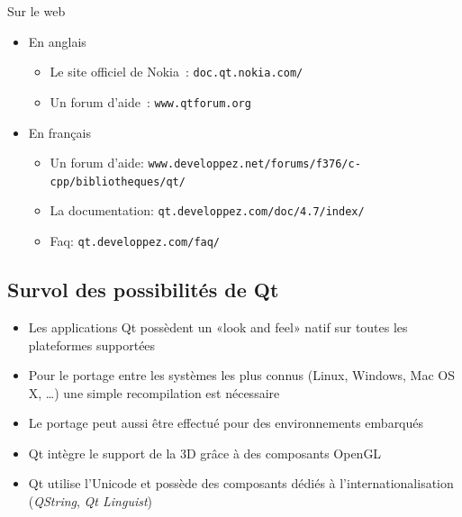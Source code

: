 \documentclass{beamer} %
\begin{document}
\begin{frame}{Sur le web}
	\begin{itemize}
	\item<1-> En anglais
		\begin{itemize}
			\item Le site officiel de Nokia~: \texttt{\small doc.qt.nokia.com/}
			\item Un forum d'aide~: \texttt{\small www.qtforum.org}
		\end{itemize}
	\vspace{10 mm}
	\item<2-> En français
		\begin{itemize}
			\item<2-> Un forum d'aide: \texttt{\small www.developpez.net/forums/f376/c-cpp/bibliotheques/qt/}
			\item<2-> La documentation: \texttt{\small qt.developpez.com/doc/4.7/index/}
			\item<2-> Faq: \texttt{\small qt.developpez.com/faq/}
		\end{itemize}
	\end{itemize}
\end{frame}

\subsection{Survol des possibilités de Qt}
\begin{frame}	
	\begin{itemize}
	\item Les applications Qt possèdent un «look and feel» natif sur toutes les plateformes supportées
	\item<2-> Pour le portage entre les systèmes les plus connus (Linux, Windows, Mac OS X, \ldots) une simple recompilation est nécessaire
	\item<3-> Le portage peut aussi être effectué pour des environnements embarqués
	\item<4-> Qt intègre le support de la 3D grâce à des composants OpenGL
	\item<5-> Qt utilise l'Unicode et possède des composants dédiés à l'internationalisation (\textit{QString}, \textit{Qt Linguist})
	\end{itemize}
\end{frame}
\end{document}
